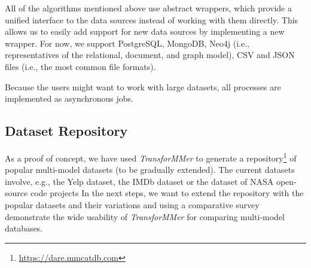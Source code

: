 All of the algorithms mentioned above use abstract wrappers, which provide a unified interface to the data sources instead of working with them directly. This allows us to easily add support for new data sources by implementing a new wrapper. For now, we support PostgreSQL, MongoDB, Neo4j (i.e., representatives of the relational, document, and graph model), CSV and JSON files (i.e., the most common file formats).

Because the users might want to work with large datasets, all processes are implemented as asynchronous jobs. %

\subsection{Dataset Repository}
As a proof of concept, we have used \textit{TransforMMer} to generate a repository\footnote{\url{https://dare.mmcatdb.com}} of popular multi-model datasets (to be gradually extended). The current datasets involve, e.g., the Yelp dataset, the IMDb dataset or the dataset of NASA open-source code projects In the next steps, we want to extend the repository with the popular datasets and their variations and using a comparative survey demonstrate the wide usability of \textit{TransforMMer} for comparing multi-model databases.
